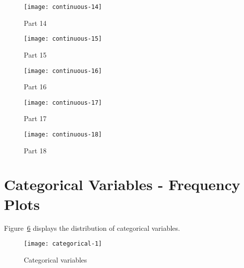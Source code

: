 \begin{figure}[ht]
    \begin{center}
    \texttt{[image: continuous-14]}
    \end{center}
    \caption{Part 14}
    \label{continuous-14}
\end{figure}

\begin{figure}[ht]
    \begin{center}
    \texttt{[image: continuous-15]}
    \end{center}
    \caption{Part 15}
    \label{continuous-15}
\end{figure}

\begin{figure}[ht]
    \begin{center}
    \texttt{[image: continuous-16]}
    \end{center}
    \caption{Part 16}
    \label{continuous-16}
\end{figure}

\begin{figure}[ht]
    \begin{center}
    \texttt{[image: continuous-17]}
    \end{center}
    \caption{Part 17}
    \label{continuous-17}
\end{figure}

\begin{figure}[ht]
    \begin{center}
    \texttt{[image: continuous-18]}
    \end{center}
    \caption{Part 18}
    \label{continuous-18}
\end{figure}

\section{Categorical Variables - Frequency Plots}
\label{sec:categorical}
Figure~\ref{categorical} displays the distribution of categorical variables.
\begin{figure}[ht]
    \begin{center}
    \texttt{[image: categorical-1]}
    \end{center}
    \caption{Categorical variables}
    \label{categorical}
\end{figure}


